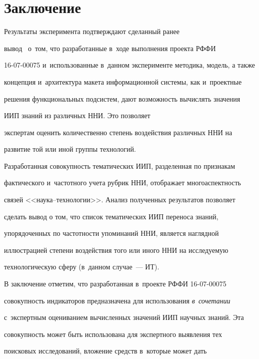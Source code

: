 \section{Заключение}


      


     Результаты эксперимента подтверждают сделанный ранее  


вывод~\cite{1-mins} о~том, что разработанные в~ходе выполнения проекта РФФИ 


16-07-00075 и~использованные в~данном эксперименте методика, модель, а также 


концепция и~архитектура макета информационной системы, как и~проектные 


решения функциональных подсистем, дают возможность вычислять значения 


ИИП знаний из различных ННИ. Это позволяет 


экспертам оценить количественно степень воздействия различных ННИ на 


развитие той или иной группы технологий.


     


     Разработанная совокупность тематических ИИП, разделенная по признакам 


фактического и~частотного учета рубрик ННИ, отображает многоаспектность 


связей <<на\-у\-ка--тех\-но\-ло\-гии>>. Анализ полученных результатов позволяет 


сделать вывод о том, что список тематических ИИП переноса знаний, 


упорядоченных по частотности упоминаний ННИ, является наглядной 


иллюстрацией степени воздействия того или иного ННИ на исследуемую 


технологическую сферу (в~данном случае~--- ИТ).


     


     В заключение отметим, что разработанная в~проекте РФФИ 16-07-00075 


совокупность индикаторов предназначена для использования \textit{в~сочетании} 


с~экспертным оцениванием вычисленных значений ИИП научных знаний. Эта 


совокупность может быть использована для экспертного выявления тех 


поисковых исследований, вложение средств в~которые может дать 


